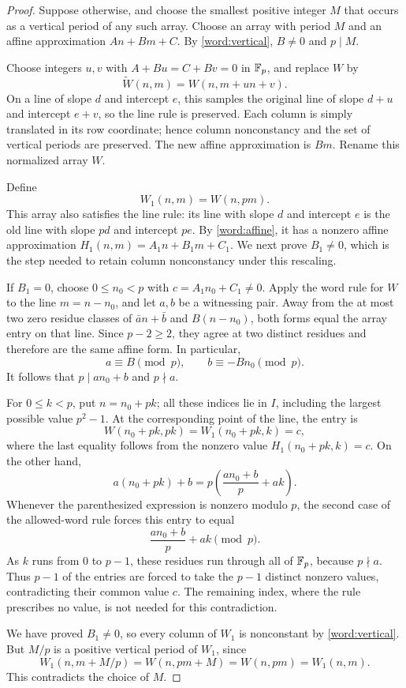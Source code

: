 \begin{proof}
Suppose otherwise, and choose the smallest positive integer $M$ that
occurs as a vertical period of any such array.  Choose an array with
period $M$ and an affine approximation $An+Bm+C$.  By
\cref{word:vertical}, $B\ne0$ and $p\mid M$.

Choose integers $u,v$ with $A+Bu=C+Bv=0$ in $\mathbb F_p$, and replace $W$ by
\[
    \widetilde W(n,m)=W(n,m+un+v).
\]
On a line of slope $d$ and intercept $e$, this samples the original
line of slope $d+u$ and intercept $e+v$, so the line rule is preserved.
Each column is simply translated in its row coordinate; hence column
nonconstancy and the set of vertical periods are preserved.  The new
affine approximation is $Bm$.  Rename this normalized array $W$.

Define
\[
    W_1(n,m)=W(n,pm).
\]
This array also satisfies the line rule: its line with slope $d$ and
intercept $e$ is the old line with slope $pd$ and intercept $pe$.
By \cref{word:affine}, it has a nonzero affine approximation
$H_1(n,m)=A_1n+B_1m+C_1$.  We next prove $B_1\ne0$, which is the step
needed to retain column nonconstancy under this rescaling.

If $B_1=0$, choose $0\leq n_0<p$ with
$c=A_1n_0+C_1\ne0$.  Apply the word rule for $W$ to the line
$m=n-n_0$, and let $a,b$ be a witnessing pair.  Away from the at most
two zero residue classes of $\bar a n+\bar b$ and $B(n-n_0)$, both
forms equal the array entry on that line.  Since $p-2\geq2$, they agree
at two distinct residues and therefore are the same affine form.  In
particular,
\[
    a\equiv B\pmod p,\qquad b\equiv-Bn_0\pmod p.
\]
It follows that $p\mid an_0+b$ and $p\nmid a$.

For $0\leq k<p$, put $n=n_0+pk$; all these indices lie in $I$,
including the largest possible value $p^2-1$.  At the corresponding
point of the line, the entry is
\[
    W(n_0+pk,pk)=W_1(n_0+pk,k)=c,
\]
where the last equality follows from the nonzero value
$H_1(n_0+pk,k)=c$.  On the other hand,
\[
    a(n_0+pk)+b
       =p\left(\frac{an_0+b}{p}+ak\right).
\]
Whenever the parenthesized expression is nonzero modulo $p$, the second
case of the allowed-word rule forces this entry to equal
\[
    \frac{an_0+b}{p}+ak\pmod p.
\]
As $k$ runs from $0$ to $p-1$, these residues run through all of $\mathbb F_p$,
because $p\nmid a$.  Thus $p-1$ of the entries are forced to take the
$p-1$ distinct nonzero values, contradicting their common value $c$.
The remaining index, where the rule prescribes no value, is not needed
for this contradiction.

We have proved $B_1\ne0$, so every column of $W_1$ is nonconstant by
\cref{word:vertical}.  But $M/p$ is a positive vertical period of $W_1$,
since
\[
    W_1(n,m+M/p)=W(n,pm+M)=W(n,pm)=W_1(n,m).
\]
This contradicts the choice of $M$.
\end{proof}

